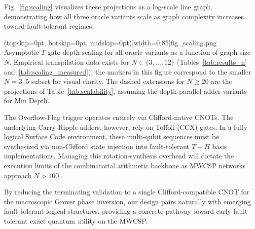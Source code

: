 \documentclass{ieeeaccess}
\begin{document}
\begin{table}[htbp]
\caption{Asymptotic Fault-Tolerant Scalability Projections (All Oracle Variants)}
\label{tab:scalability}
\centering
{}
\end{table}

Fig.~\ref{fig:scaling} visualizes these projections as a log-scale line graph, demonstrating how all three oracle variants scale as graph complexity increases toward fault-tolerant regimes.

\Figure[t!](topskip=0pt, botskip=0pt, midskip=0pt)[width=0.85\columnwidth]{fig_scaling.png}
{Asymptotic $T$-gate depth scaling for all oracle variants as a function of graph size $N$. Empirical transpilation data exists for $N \in \{3,\dots,12\}$ (Tables~\ref{tab:results_n} and~\ref{tab:scaling_measured}); the markers in this figure correspond to the smaller $N=3$--$5$ subset for visual clarity. The dashed extensions for $N \ge 20$ are the projections of Table~\ref{tab:scalability}, assuming the depth-parallel adder variants for Min Depth.\label{fig:scaling}}

The Overflow-Flag trigger operates entirely via Clifford-native CNOTs. The underlying Carry-Ripple adders, however, rely on Toffoli (CCX) gates. In a fully logical Surface Code environment, these multi-qubit sequences must be synthesized via non-Clifford state injection into fault-tolerant $T + H$ basis implementations. Managing this rotation-synthesis overhead will dictate the execution limits of the combinatorial arithmetic backbone as MWCSP networks approach $N > 100$.

By reducing the terminating validation to a single Clifford-compatible CNOT for the macroscopic Grover phase inversion, our design pairs naturally with emerging fault-tolerant logical structures, providing a concrete pathway toward early fault-tolerant exact quantum utility on the MWCSP.
\end{document}
